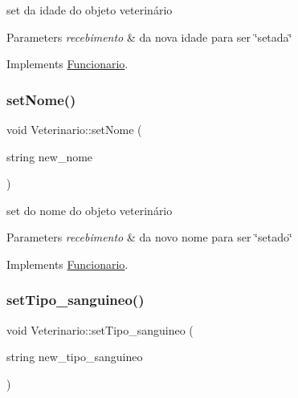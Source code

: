 set da idade do objeto veterinário 


\begin{DoxyParams}{Parameters}
{\em recebimento} & da nova idade para ser \char`\"{}setada\char`\"{} \\
\hline
\end{DoxyParams}


Implements \mbox{\hyperlink{class_funcionario}{Funcionario}}.

\mbox{\label{class_veterinario_ad024ac2118285e41800b495b6cef7d7b}} 
\subsubsection{\texorpdfstring{setNome()}{setNome()}}
{\footnotesize\ttfamily void Veterinario\+::set\+Nome (\begin{DoxyParamCaption}\item[{string}]{new\+\_\+nome }\end{DoxyParamCaption})\hspace{0.3cm}{\ttfamily [virtual]}}



set do nome do objeto veterinário 


\begin{DoxyParams}{Parameters}
{\em recebimento} & da novo nome para ser \char`\"{}setado\char`\"{} \\
\hline
\end{DoxyParams}


Implements \mbox{\hyperlink{class_funcionario}{Funcionario}}.

\mbox{\label{class_veterinario_a48a7f01fb9ccb2bff9c1c51f5fb55daf}} 
\subsubsection{\texorpdfstring{setTipo\_sanguineo()}{setTipo\_sanguineo()}}
{\footnotesize\ttfamily void Veterinario\+::set\+Tipo\+\_\+sanguineo (\begin{DoxyParamCaption}\item[{string}]{new\+\_\+tipo\+\_\+sanguineo }\end{DoxyParamCaption})\hspace{0.3cm}{\ttfamily [virtual]}}



